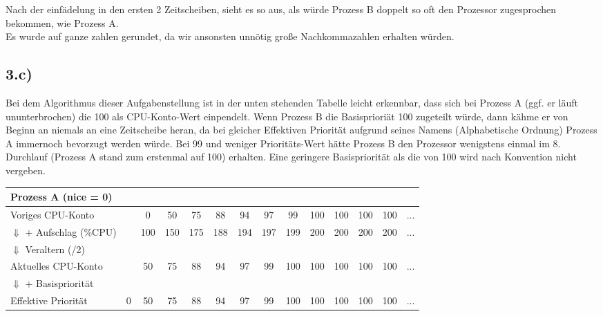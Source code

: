 \documentclass{ti2}
\begin{document}
Nach der einfädelung in den ersten 2 Zeitscheiben, sieht es so aus, als würde Prozess B doppelt so oft den Prozessor zugesprochen bekommen, wie Prozess A.\\

Es wurde auf ganze zahlen gerundet, da wir ansonsten unnötig große Nachkommazahlen erhalten würden.

\subsection*{3.c)}

Bei dem Algorithmus dieser Aufgabenstellung ist in der unten stehenden Tabelle leicht erkennbar, dass sich bei Prozess A (ggf. er läuft ununterbrochen) die 100 als CPU-Konto-Wert einpendelt. Wenn Prozess B die Basisprioriät 100 zugeteilt würde, dann kähme er von Beginn an niemals an eine Zeitscheibe heran, da bei gleicher Effektiven Priorität aufgrund seines Namens (Alphabetische Ordnung) Prozess A immernoch bevorzugt werden würde. Bei 99 und weniger Prioritäts-Wert hätte Prozess B den Prozessor wenigstens einmal im 8. Durchlauf (Prozess A stand zum erstenmal auf 100) erhalten. Eine geringere Basispriorität als die von 100 wird nach Konvention nicht vergeben.\\


\begin{tabular}{l|c c c c c c c c c c c c c}
	Prozess A (nice = 0)             & & & & & & & & & & & & \\
	\hline
	Voriges CPU-Konto                &  &   0&  50&  75&  88&  94&  97&  99& 100& 100& 100& 100& ...\\
	$\Downarrow$ + Aufschlag (\%CPU) &  & 100& 150& 175& 188& 194& 197& 199& 200& 200& 200& 200& ...\\
	$\Downarrow$ Veraltern (/2)      &  &    &    &    &    &    &    &    &    &    &    &    &    \\
	Aktuelles CPU-Konto              &  &  50&  75&  88&  94&  97&  99& 100& 100& 100& 100& 100& ...\\
	$\Downarrow$ + Basispriorität    &  &    &    &    &    &    &    &    &    &    &    &    &    \\
	Effektive Priorität              & 0&  50&  75&  88&  94&  97&  99& 100& 100& 100& 100& 100& ...\\
\end{tabular}
\end{document}
